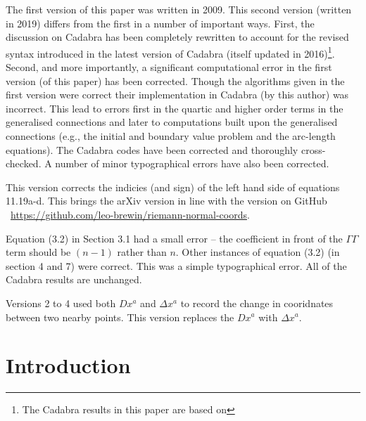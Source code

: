 \documentclass[a4paper,12pt]{article}
\numberwithin{equation}{section}
\begin{document}
\bgroup
{}
\small%
The first version of this paper was written in 2009. This second version (written in 2019)
differs from the first in a number of important ways. First, the discussion on Cadabra has
been completely rewritten to account for the revised syntax introduced in the latest version
of Cadabra (itself updated in 2016)\footnote{The Cadabra results in this paper are based on
\CdbVersion}. Second, and more importantly, a significant computational error in the first
version (of this paper) has been corrected. Though the algorithms given in the first version
were correct their implementation in Cadabra (by this author) was incorrect. This lead to
errors first in the quartic and higher order terms in the generalised connections and later to computations built upon the generalised connections (e.g., the initial and
boundary value problem and the arc-length equations). The Cadabra codes have been corrected
and thoroughly cross-checked. A number of minor typographical errors have also been
corrected.
\vskip 2pt

\small%
This version corrects the indicies (and sign) of the left hand side of equations 11.19a-d.
This brings the arXiv version in line with the version on GitHub
\ \url{https://github.com/leo-brewin/riemann-normal-coords}.
\vskip 2pt

\small%
Equation (3.2) in Section 3.1 had a small error -- the coefficient in front of the $\Gamma \Gamma$
term should be $(n-1)$ rather than $n$. Other instances of equation (3.2) (in section 4 and 7)
were correct. This was a simple typographical error. All of the Cadabra results are unchanged.

\vskip 2pt

\small%
Versions 2 to 4 used both $Dx^a$ and $\Delta x^a$ to record the change in cooridnates between
two nearby points. This version replaces the $Dx^a$ with $\Delta x^a$.
\EndNote
\egroup

\section{Introduction}
\end{document}
